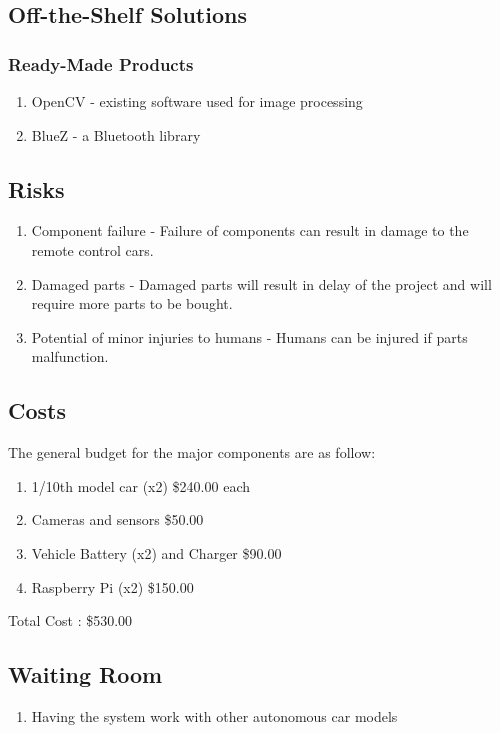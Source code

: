 \documentclass [11pt]{article}
\begin{document}
\subsection{Off-the-Shelf Solutions}

\subsubsection{Ready-Made Products}
	\begin{enumerate}[label=\textbf{\Alph*}:]
		\item OpenCV  - existing software used for image processing
		\item BlueZ - a Bluetooth library
	\end{enumerate}


\subsection{Risks}
	\begin{enumerate}[label=\textbf{\Alph*}:]
		\item Component failure - Failure of components can result in damage to the remote control cars.
		\item Damaged parts - Damaged parts will result in delay of the project and will require more parts to be bought.
		\item Potential of minor injuries to humans - Humans can be injured if parts malfunction. 
	\end{enumerate}
	

	
\subsection{Costs}	
		
		The general budget for the major components are as follow:

		\begin{enumerate}[label=\textbf{\Alph*}:]
			\item 1/10th model car (x2) \$240.00 each
			\item Cameras and sensors \$50.00
			\item Vehicle Battery (x2) and Charger \$90.00
			\item Raspberry Pi (x2) \$150.00
		\end{enumerate}
		
		Total Cost : \$530.00


\subsection{Waiting Room}
	\begin{enumerate}[label=\textbf{\Alph*}:]
		\item Having the system work with other autonomous car models
	    \end{enumerate} 
\end{document}
